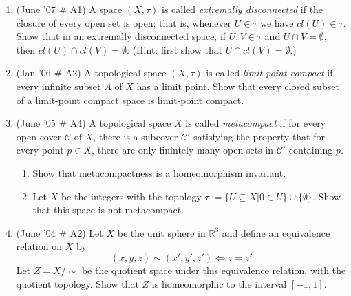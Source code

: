 \documentclass[psamsfonts, 11pt, reqno]{amsart}
\begin{document}
\begin{enumerate}
\item (June '07 \# A1) A space $(X, \tau)$ is called \emph{extremally disconnected} if the closure of every open
set is open; that is, whenever $U \in \tau$ we have $cl(U) \in \tau$.  Show that in an extremally disconnected space, if
$U, V \in \tau$ and $U \cap V = \emptyset$, then $cl(U) \cap cl(V) = \emptyset$. (Hint: first show that
$U \cap cl(V) = \emptyset$.)

\vfill

\item (Jan '06 \# A2) A topological space $(X, \tau)$ is called \emph{limit-point compact} if every infinite
subset $A$ of $X$ has a limit point. Show that every closed subset of a limit-point compact space is limit-point compact.

\vfill

\item (June '05 \# A4) A topological space $X$ is called \emph{metacompact} if for every open cover $\mathcal{C}$ of $X$,
there is a subcover $\mathcal{C}'$ satisfying the property that for every point $p \in X$, there are only finintely many open
sets in $\mathcal{C}'$ containing $p$.

\begin{enumerate}
\item Show that metacompactness is a homeomorphism invariant.
\item Let $X$ be the integers with the topology $\tau := \{ U \subseteq X | 0 \in U \} \cup \{ \emptyset \}$.  Show
that this space is not metacompact.
\end{enumerate}

\vfill

\item (June '04 \# A2) Let $X$ be the unit sphere in $\mathbb{R}^3$ and define an equivalence relation on $X$ by 
$$(x, y, z) \sim (x', y', z') \Leftrightarrow z = z'$$
Let $Z = X / \sim$ be the quotient space under this equivalence relation, with the quotient topology.  Show that $Z$
is homeomorphic to the interval $[-1,1]$.

\vfill

\end{enumerate}
\end{document}
